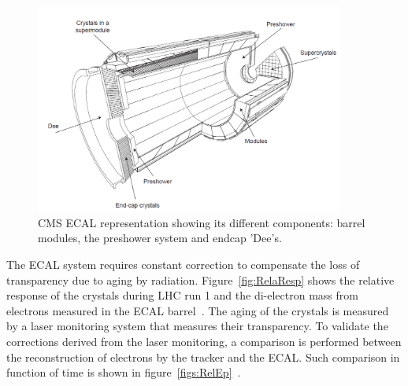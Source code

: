 \begin{figure}[!Hhtbp]
  \begin{center}
    \includegraphics[width=0.9\textwidth]{figs/ECAL.png}
    \caption{CMS ECAL representation showing its different components: barrel modules, the preshower system and endcap 'Dee's.}
    \label{fig:ecal}
  \end{center}
\end{figure}

The ECAL system requires constant correction to compensate the loss of transparency due to aging by radiation. Figure~\ref{fig:RelaResp} shows the relative response of the crystals during LHC run 1 and the di-electron mass from electrons measured in the ECAL barrel~\cite{CMS-DP-2012-015}. The aging of the crystals is measured by a laser monitoring system that measures their transparency. To validate the corrections derived from the laser monitoring, a comparison is performed between the reconstruction of electrons by the tracker and the ECAL. Such comparison in function of time is shown in figure~\ref{figs:RelEp}~\cite{CMS-DP-2012-015}.

